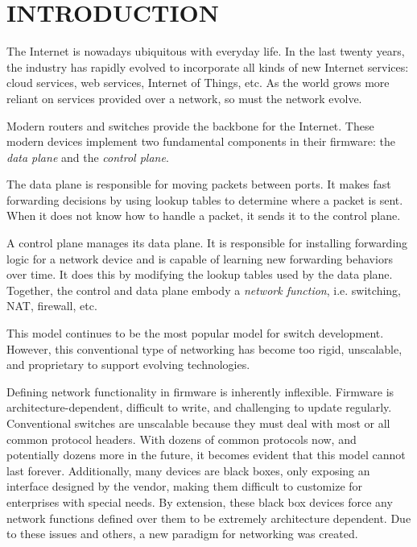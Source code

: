 \chapter{INTRODUCTION} \label{ch:intro}

%
%



The Internet is nowadays ubiquitous with everyday life. In the last twenty years,
the industry has rapidly evolved to incorporate all kinds of new Internet services:
cloud services, web services, Internet of Things, etc. As the world grows
more reliant on services provided over a network, so must the network evolve.

Modern routers and switches provide the backbone for the Internet.
These modern devices implement two fundamental components in their firmware: the
\emph{data plane} and the \emph{control plane}.

The data plane is responsible for moving packets between ports.
It makes fast forwarding decisions by using lookup tables to determine
where a packet is sent. When it does
not know how to handle a packet, it sends it to the control plane.

A control plane manages its data plane.
It is responsible for installing forwarding logic for a network device and is
capable of learning new forwarding behaviors over time.
It does this by modifying the lookup tables used by the data plane.
Together, the control and data plane embody a \emph{network function}, i.e. switching, NAT, firewall, etc.

This model continues to be the most popular model for switch development.
However,
this conventional type of networking has become too rigid, unscalable, and
proprietary to support evolving technologies. 

Defining network functionality in firmware is inherently inflexible.
Firmware is architecture-dependent, difficult to write, and challenging to update
regularly.
Conventional switches are unscalable because they must deal with most or all
common protocol headers.
With dozens of common protocols now, and potentially dozens more in the future,
it becomes evident that this model cannot last forever.
Additionally, many devices are black boxes,
only exposing an interface designed by the vendor,
making them difficult to customize for enterprises with special needs.
By extension, these black box devices force any network functions
defined over them to be extremely architecture dependent.
Due to these issues and others, a new paradigm for networking was created. 


